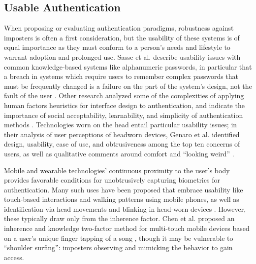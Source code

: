 \documentclass[a4paper,twoside]{article}
\begin{document}
\subsection{Usable Authentication}

\noindent When proposing or evaluating authentication paradigms, robustness against imposters is often a first consideration, but the usability of these systems is of equal importance as they must conform to a person's needs and lifestyle to warrant adoption and prolonged use. Sasse et al. describe usability issues with common knowledge-based systems like alphanumeric passwords, in particular that a breach in systems which require users to remember complex passwords that must be frequently changed is a failure on the part of the system's design, not the fault of the user \cite{sasse2001}. Other research analyzed some of the complexities of applying human factors heuristics for interface design to authentication, and indicate the importance of social acceptability, learnability, and simplicity of authentication methods \cite{braz2006}. Technologies worn on the head entail particular usability issues; in their analysis of user perceptions of headworn devices, Genaro et al. identified design, usability, ease of use, and obtrusiveness among the top ten concerns of users, as well as qualitative comments around comfort and ``looking weird'' \cite{Genaro2014}.

Mobile and wearable technologies' continuous proximity to the user's body provides favorable conditions for unobtrusively capturing biometrics for authentication. Many such uses have been proposed that embrace usability like touch-based interactions \cite{Tartz2015,Holz2015} and walking patterns \cite{Lu2014} using mobile phones, as well as identification via head movements and blinking in head-worn devices \cite{Rogers2015}. However, these typically draw only from the inherence factor. Chen et al. proposed an inherence and knowledge two-factor method for multi-touch mobile devices based on a user's unique finger tapping of a song \cite{Chen2015}, though it may be vulnerable to ``shoulder surfing'': imposters observing and mimicking the behavior to gain access.
\end{document}
